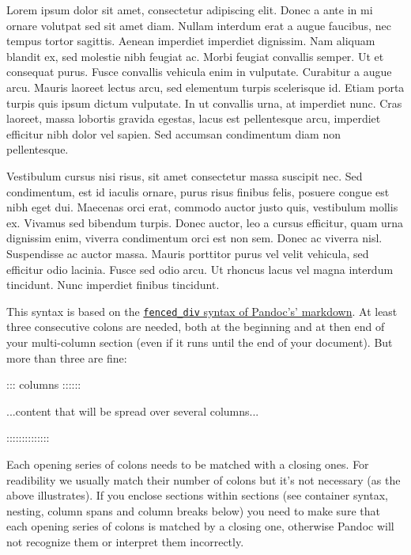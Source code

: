 \documentclass[
]{article}
\newenvironment{Shaded}{}{}
\newcommand{\NormalTok}[1]{#1}
\begin{document}
{\raggedcolumns\begin{multicols}{2}

Lorem ipsum dolor sit amet, consectetur adipiscing elit. Donec a ante in
mi ornare volutpat sed sit amet diam. Nullam interdum erat a augue
faucibus, nec tempus tortor sagittis. Aenean imperdiet imperdiet
dignissim. Nam aliquam blandit ex, sed molestie nibh feugiat ac. Morbi
feugiat convallis semper. Ut et consequat purus. Fusce convallis
vehicula enim in vulputate. Curabitur a augue arcu. Mauris laoreet
lectus arcu, sed elementum turpis scelerisque id. Etiam porta turpis
quis ipsum dictum vulputate. In ut convallis urna, at imperdiet nunc.
Cras laoreet, massa lobortis gravida egestas, lacus est pellentesque
arcu, imperdiet efficitur nibh dolor vel sapien. Sed accumsan
condimentum diam non pellentesque.

Vestibulum cursus nisi risus, sit amet consectetur massa suscipit nec.
Sed condimentum, est id iaculis ornare, purus risus finibus felis,
posuere congue est nibh eget dui. Maecenas orci erat, commodo auctor
justo quis, vestibulum mollis ex. Vivamus sed bibendum turpis. Donec
auctor, leo a cursus efficitur, quam urna dignissim enim, viverra
condimentum orci est non sem. Donec ac viverra nisl. Suspendisse ac
auctor massa. Mauris porttitor purus vel velit vehicula, sed efficitur
odio lacinia. Fusce sed odio arcu. Ut rhoncus lacus vel magna interdum
tincidunt. Nunc imperdiet finibus tincidunt.

\end{multicols}
}

This syntax is based on the
\href{https://pandoc.org/MANUAL.html\#divs-and-spans}{\texttt{fenced\_div}
syntax of Pandoc's' markdown}. At least three consecutive colons are
needed, both at the beginning and at then end of your multi-column
section (even if it runs until the end of your document). But more than
three are fine:

\begin{Shaded}
\begin{Highlighting}[]
\NormalTok{::: columns ::::::}

\NormalTok{...content that will be spread over several columns...}

\NormalTok{::::::::::::::}
\end{Highlighting}
\end{Shaded}

Each opening series of colons needs to be matched with a closing ones.
For readibility we usually match their number of colons but it's not
necessary (as the above illustrates). If you enclose sections within
sections (see container syntax, nesting, column spans and column breaks
below) you need to make sure that each opening series of colons is
matched by a closing one, otherwise Pandoc will not recognize them or
interpret them incorrectly.
\end{document}
